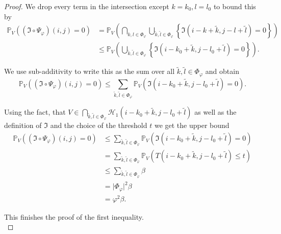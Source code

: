 \documentclass[a4paper,12pt]{article}
\newcommand{\abs}[1]{\lvert#1\rvert}
\theoremstyle{plain}
\theoremstyle{definition}
\begin{document}
\begin{proof}
	We drop every term in the intersection except $k = k_0, l = l_0$ to bound this by
	\begin{align*}
		\mathbb{P}_V\left( (\mathfrak{I} \circ \Psi_\varphi)(i, j) = 0 \right) &= \mathbb{P}_V\left( \bigcap_{k, l \in \Phi_\varphi} \bigcup_{\tilde{k}, \tilde{l} \in \Phi_\varphi} \left\{ \mathfrak{I}(i - k + \tilde{k}, j - l + \tilde{l}) = 0 \right\} \right) \\
		&\leq \mathbb{P}_V\left( \bigcup_{\tilde{k}, \tilde{l} \in \Phi_\varphi} \left\{ \mathfrak{I}(i - k_0 + \tilde{k}, j - l_0 + \tilde{l}) = 0 \right\} \right).
	\end{align*}
	
	We use sub-additivity to write this as the sum over all $\tilde{k}, \tilde{l} \in \Phi_\varphi$ and obtain
	\begin{equation*}
		\mathbb{P}_V\left( (\mathfrak{I} \circ \Psi_\varphi)(i, j) = 0 \right) \leq \sum_{\tilde{k}, \tilde{l} \in \Phi_\varphi} \mathbb{P}_V\left( \mathfrak{I}(i - k_0 + \tilde{k}, j - l_0 + \tilde{l}) = 0 \right).
	\end{equation*}
	
	Using the fact, that $V \in \bigcap_{\tilde{k}, \tilde{l} \in \Phi_\varphi} \mathcal{H}_1(i - k_0 + \tilde{k}, j - l_0 + \tilde{l})$ as well as the definition of $\mathfrak{I}$ and the choice of the threshold $t$ we get the upper bound
	\begin{align*}
		\mathbb{P}_V\left( (\mathfrak{I} \circ \Psi_\varphi)(i, j) = 0 \right) &\leq \sum_{\tilde{k}, \tilde{l} \in \Phi_\varphi} \mathbb{P}_V\left( \mathfrak{I}(i - k_0 + \tilde{k}, j - l_0 + \tilde{l}) = 0 \right) \\
		&= \sum_{\tilde{k}, \tilde{l} \in \Phi_\varphi} \mathbb{P}_V\left( T(i - k_0 + \tilde{k}, j - l_0 + \tilde{l}) \leq t \right) \\
		&\leq \sum_{\tilde{k}, \tilde{l} \in \Phi_\varphi} \beta \\
		&= \abs{\Phi_\varphi}^2 \beta \\
		&= \varphi^2 \beta.
	\end{align*}
	
	This finishes the proof of the first inequality.\\
	

\end{proof}
\end{document}
